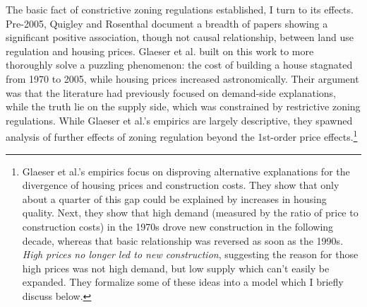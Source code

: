 \documentclass{article}[11pt]
\begin{document}
The basic fact of constrictive zoning regulations established, I turn to its effects. Pre-2005, Quigley and Rosenthal document a breadth of papers showing a significant positive association, though not causal relationship, between land use regulation and housing prices. \citep{quigley2005effects} Glaeser et al. built on this work to more thoroughly solve a puzzling phenomenon: the cost of building a house stagnated from 1970 to 2005, while housing prices increased astronomically. \citep{glaeser2005empirical} Their argument was that the literature had previously focused on demand-side explanations, while the truth lie on the supply side, which was constrained by restrictive zoning regulations. While Glaeser et al.'s empirics are largely descriptive, they spawned analysis of further effects of zoning regulation beyond the 1st-order price effects.\footnote{Glaeser et al.'s empirics focus on disproving alternative explanations for the divergence of housing prices and construction costs. They show that only about a quarter of this gap could be explained by increases in housing quality. Next, they show that high demand (measured by the ratio of price to construction costs) in the 1970s drove new construction in the following decade, whereas that basic relationship was reversed as soon as the 1990s. \textit{High prices no longer led to new construction}, suggesting the reason for those high prices was not high demand, but low supply which can't easily be expanded. They formalize some of these ideas into a model which I briefly discuss below.} 
\end{document}
